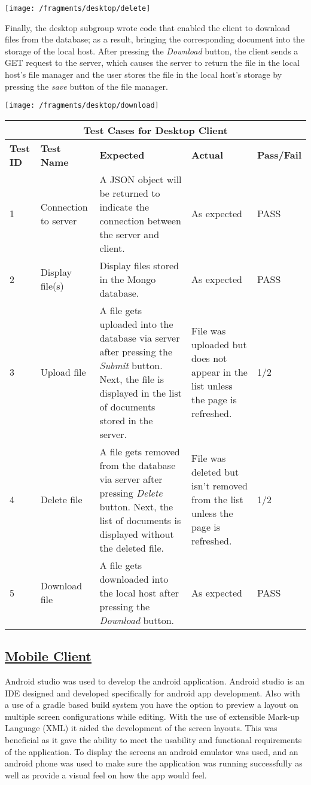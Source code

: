 \documentclass{article}
\begin{document}
\texttt{[image: /fragments/desktop/delete]}

Finally, the desktop subgroup wrote code that enabled the client to download files from the database; as a result, bringing the corresponding document into the storage of the local host. After pressing the \textit{Download} button, the client sends a GET request to the server, which causes the server to return the file in the local host's file manager and the user stores the file in the local host's storage by pressing the \textit{save} button of the file manager.

\texttt{[image: /fragments/desktop/download]}

\begin{tabular}{|p{2cm}|p{2cm}|p{3cm}|p{3cm}|p{3cm}|}
\hline
\multicolumn{5}{|c|}{\textbf{Test Cases for Desktop Client}} \\
\hline
\textbf{Test ID} & \textbf{Test Name} & \textbf{Expected} & \textbf{Actual} & \textbf{Pass/Fail} \\
\hline
1 & Connection to server & A JSON object will be returned to indicate the connection between the server and client.  & As expected & PASS \\
\hline
2 & Display file(s) & Display files stored in the Mongo database. & As expected & PASS \\
\hline
3 & Upload file & A file gets uploaded into the database via server after pressing the \textit{Submit} button. Next, the file is displayed in the list of documents stored in the server. & File was uploaded but does not appear in the list unless the page is refreshed. & 1/2 \\
\hline
4 & Delete file & A file gets removed from the database via server after pressing \textit{Delete} button. Next, the list of documents is displayed without the deleted file. & File was deleted but isn't removed from the list unless the page is refreshed. & 1/2 \\
\hline
5 & Download file & A file gets downloaded into the local host after pressing the \textit{Download} button. & As expected & PASS \\
\hline
\end{tabular}

\subsection{\underline{Mobile Client}}
Android studio was used to develop the android application. Android studio is an IDE designed and developed specifically for android app development. Also with a use of a gradle based build system you have the option to preview a layout on multiple screen configurations while editing. With the use of extensible Mark-up Language (XML) it aided the development of the screen layouts. This was beneficial as it gave the ability to meet the usability and functional requirements of the application. To display the screens an android emulator was used, and an android phone was used to make sure the application was running successfully as well as provide a visual feel on how the app would feel.
\end{document}
